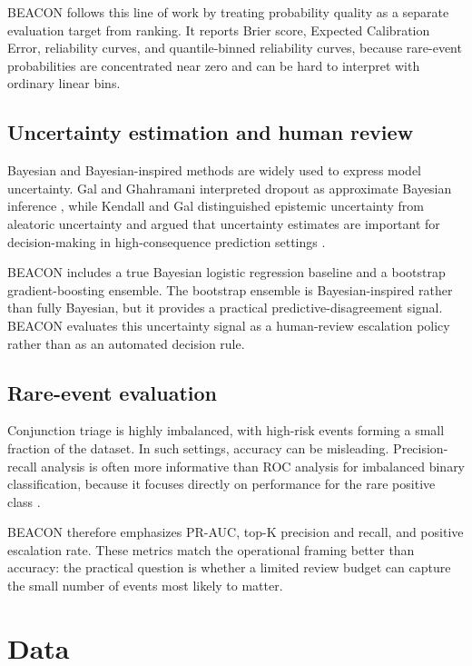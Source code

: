 \documentclass[11pt]{article}
\begin{document}
BEACON follows this line of work by treating probability quality as a separate evaluation target from ranking. It reports Brier score, Expected Calibration Error, reliability curves, and quantile-binned reliability curves, because rare-event probabilities are concentrated near zero and can be hard to interpret with ordinary linear bins.

\subsection{Uncertainty estimation and human review}

Bayesian and Bayesian-inspired methods are widely used to express model uncertainty. Gal and Ghahramani interpreted dropout as approximate Bayesian inference \citep{gal2016dropout}, while Kendall and Gal distinguished epistemic uncertainty from aleatoric uncertainty and argued that uncertainty estimates are important for decision-making in high-consequence prediction settings \citep{kendall2017uncertainties}.

BEACON includes a true Bayesian logistic regression baseline and a bootstrap gradient-boosting ensemble. The bootstrap ensemble is Bayesian-inspired rather than fully Bayesian, but it provides a practical predictive-disagreement signal. BEACON evaluates this uncertainty signal as a human-review escalation policy rather than as an automated decision rule.

\subsection{Rare-event evaluation}

Conjunction triage is highly imbalanced, with high-risk events forming a small fraction of the dataset. In such settings, accuracy can be misleading. Precision-recall analysis is often more informative than ROC analysis for imbalanced binary classification, because it focuses directly on performance for the rare positive class \citep{saito2015precision}.

BEACON therefore emphasizes PR-AUC, top-K precision and recall, and positive escalation rate. These metrics match the operational framing better than accuracy: the practical question is whether a limited review budget can capture the small number of events most likely to matter.

\section{Data}
\end{document}

